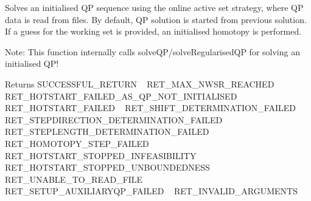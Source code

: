 Solves an initialised QP sequence using the online active set strategy, where QP data is read from files. By default, QP solution is started from previous solution. If a guess for the working set is provided, an initialised homotopy is performed.

Note\+: This function internally calls solve\+Q\+P/solve\+Regularised\+QP for solving an initialised Q\+P!

\begin{DoxyReturn}{Returns}
S\+U\+C\+C\+E\+S\+S\+F\+U\+L\+\_\+\+R\+E\+T\+U\+RN ~\newline
 R\+E\+T\+\_\+\+M\+A\+X\+\_\+\+N\+W\+S\+R\+\_\+\+R\+E\+A\+C\+H\+ED ~\newline
 R\+E\+T\+\_\+\+H\+O\+T\+S\+T\+A\+R\+T\+\_\+\+F\+A\+I\+L\+E\+D\+\_\+\+A\+S\+\_\+\+Q\+P\+\_\+\+N\+O\+T\+\_\+\+I\+N\+I\+T\+I\+A\+L\+I\+S\+ED ~\newline
 R\+E\+T\+\_\+\+H\+O\+T\+S\+T\+A\+R\+T\+\_\+\+F\+A\+I\+L\+ED ~\newline
 R\+E\+T\+\_\+\+S\+H\+I\+F\+T\+\_\+\+D\+E\+T\+E\+R\+M\+I\+N\+A\+T\+I\+O\+N\+\_\+\+F\+A\+I\+L\+ED ~\newline
 R\+E\+T\+\_\+\+S\+T\+E\+P\+D\+I\+R\+E\+C\+T\+I\+O\+N\+\_\+\+D\+E\+T\+E\+R\+M\+I\+N\+A\+T\+I\+O\+N\+\_\+\+F\+A\+I\+L\+ED ~\newline
 R\+E\+T\+\_\+\+S\+T\+E\+P\+L\+E\+N\+G\+T\+H\+\_\+\+D\+E\+T\+E\+R\+M\+I\+N\+A\+T\+I\+O\+N\+\_\+\+F\+A\+I\+L\+ED ~\newline
 R\+E\+T\+\_\+\+H\+O\+M\+O\+T\+O\+P\+Y\+\_\+\+S\+T\+E\+P\+\_\+\+F\+A\+I\+L\+ED ~\newline
 R\+E\+T\+\_\+\+H\+O\+T\+S\+T\+A\+R\+T\+\_\+\+S\+T\+O\+P\+P\+E\+D\+\_\+\+I\+N\+F\+E\+A\+S\+I\+B\+I\+L\+I\+TY ~\newline
 R\+E\+T\+\_\+\+H\+O\+T\+S\+T\+A\+R\+T\+\_\+\+S\+T\+O\+P\+P\+E\+D\+\_\+\+U\+N\+B\+O\+U\+N\+D\+E\+D\+N\+E\+SS ~\newline
 R\+E\+T\+\_\+\+U\+N\+A\+B\+L\+E\+\_\+\+T\+O\+\_\+\+R\+E\+A\+D\+\_\+\+F\+I\+LE ~\newline
 R\+E\+T\+\_\+\+S\+E\+T\+U\+P\+\_\+\+A\+U\+X\+I\+L\+I\+A\+R\+Y\+Q\+P\+\_\+\+F\+A\+I\+L\+ED ~\newline
 R\+E\+T\+\_\+\+I\+N\+V\+A\+L\+I\+D\+\_\+\+A\+R\+G\+U\+M\+E\+N\+TS 
\end{DoxyReturn}


